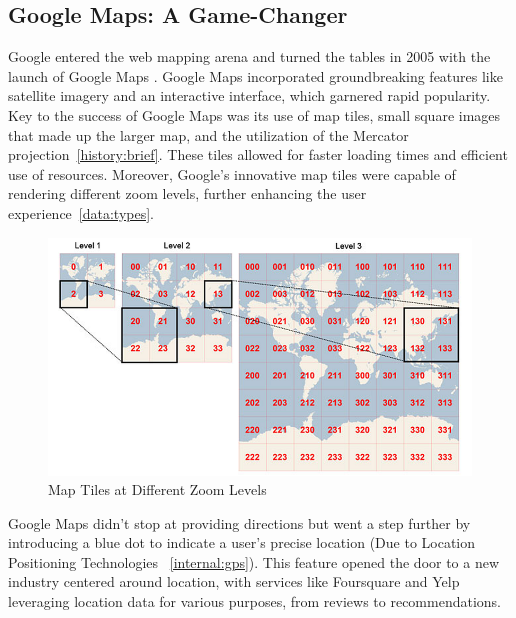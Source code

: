 \documentclass[10pt,oneside,english,a4paper]{article}
\begin{document}
\subsection{Google Maps: A Game-Changer} \label{history:gamechanger}
Google entered the web mapping arena and turned the tables in 2005 with the launch of Google Maps \cite{Forrest2021}. Google Maps incorporated groundbreaking features like satellite imagery and an interactive interface, which garnered rapid popularity. 
\\Key to the success of Google Maps was its use of map tiles, small square images that made up the larger map, and the utilization of the Mercator projection~\ref{history:brief}. These tiles allowed for faster loading times and efficient use of resources. Moreover, Google's innovative map tiles were capable of rendering different zoom levels, further enhancing the user experience~\ref{data:types}. 

\begin{figure}[h]
	\centering
	\includegraphics[scale=0.35]{diagram5.png}
	\caption{Map Tiles at Different Zoom Levels \cite{Forrest2021}}
	\label{fig:tiles}
\end{figure}

Google Maps didn't stop at providing directions but went a step further by introducing a blue dot to indicate a user's precise location (Due to Location Positioning Technologies ~\ref{internal:gps}). This feature opened the door to a new industry centered around location, with services like Foursquare and Yelp leveraging location data for various purposes, from reviews to recommendations.
\end{document}
